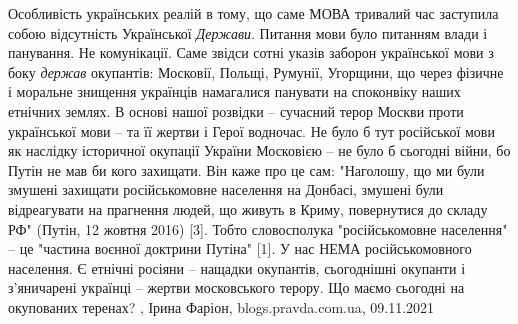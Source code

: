  
 
 
 
 

Особливість українських реалій в тому, що саме МОВА тривалий час заступила
собою відсутність Української \emph{Держави}. Питання мови було питанням влади і
панування. Не комунікації. Саме звідси сотні указів заборон української мови з
боку \emph{держав} окупантів: Московії, Польщі, Румунії, Угорщини, що через фізичне і
моральне знищення українців намагалися панувати на споконвіку наших етнічних
землях.  В основі нашої розвідки – сучасний терор Москви проти української мови
– та її жертви і Герої водночас. Не було б тут російської мови як наслідку
історичної окупації України Московією – не було б сьогодні війни, бо Путін не
мав би кого захищати. Він каже про це сам: "Наголошу, що ми були змушені
захищати російськомовне населення на Донбасі, змушені були відреагувати на
прагнення людей, що живуть в Криму, повернутися до складу РФ" (Путін, 12 жовтня
2016) [3].  Тобто словосполука "російськомовне населення" – це "частина воєнної
доктрини Путіна" [1]. У нас НЕМА російськомовного населення. Є етнічні росіяни
– нащадки окупантів, сьогоднішні окупанти і з'яничарені українці – жертви
московського терору.  Що маємо сьогодні на окупованих теренах?
, 
Ірина Фаріон, blogs.pravda.com.ua, 09.11.2021
